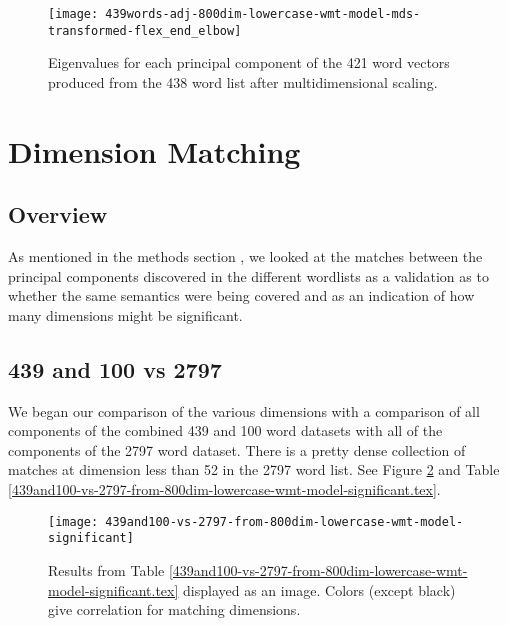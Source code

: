 \documentclass[eric_thesis.tex]{subfiles}
\begin{document}
\begin{figure}[!tbp]
    \texttt{[image: 439words-adj-800dim-lowercase-wmt-model-mds-transformed-flex\_end\_elbow]}
    \caption{Eigenvalues for each principal component of the 421 word vectors
    produced from the 438 word list after multidimensional scaling.}
    \label{fig:438wordsmdseigenvalues}
\end{figure}



\section{Dimension Matching}
\subsection{Overview}

As mentioned in the methods section , we looked at the matches between the principal components
discovered in the different wordlists as a validation as to whether the same
semantics were being covered and as an indication of how many dimensions might 
be significant.

\subsection{439 and 100 vs 2797}

We began our comparison of the various dimensions with a comparison of all 
components of the combined 439 and 100 word datasets with all of the components
of the 2797 word dataset. There is a pretty dense collection of matches at
dimension less than 52 in the 2797 word list. See Figure 
\ref{fig:439and100vs2797} and Table
\ref{439and100-vs-2797-from-800dim-lowercase-wmt-model-significant.tex}. 



\begin{figure}[!tbp]
    \texttt{[image: 439and100-vs-2797-from-800dim-lowercase-wmt-model-significant]}
    \caption{Results from Table 
    \ref{439and100-vs-2797-from-800dim-lowercase-wmt-model-significant.tex} 
    displayed as an image. Colors (except black) give correlation for matching 
    dimensions.}
    \label{fig:439and100vs2797}
\end{figure}
\end{document}
